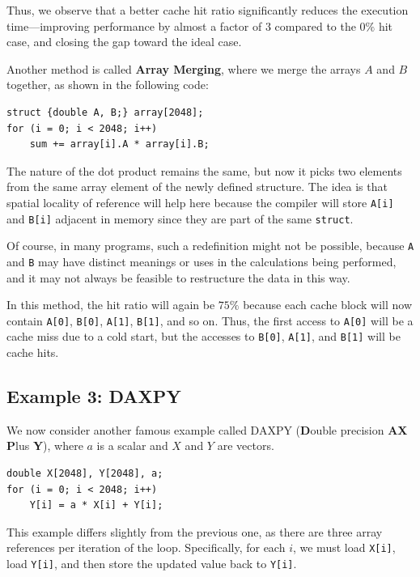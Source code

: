 \documentclass[12pt]{book}
\begin{document}
Thus, we observe that a better cache hit ratio significantly reduces the execution time—improving performance by almost a factor of $3$ compared to the $0\%$ hit case, and closing the gap toward the ideal case.


Another method is called \textbf{Array Merging}, where we merge the arrays $A$ and $B$ together, as shown in the following code:

\begin{lstlisting}[style=cppstyle]
struct {double A, B;} array[2048];
for (i = 0; i < 2048; i++) 
    sum += array[i].A * array[i].B;
\end{lstlisting}

The nature of the dot product remains the same, but now it picks two elements from the same array element of the newly defined structure. The idea is that spatial locality of reference will help here because the compiler will store \texttt{A[i]} and \texttt{B[i]} adjacent in memory since they are part of the same \texttt{struct}. 

Of course, in many programs, such a redefinition might not be possible, because \texttt{A} and \texttt{B} may have distinct meanings or uses in the calculations being performed, and it may not always be feasible to restructure the data in this way.

In this method, the hit ratio will again be $75\%$ because each cache block will now contain \texttt{A[0]}, \texttt{B[0]}, \texttt{A[1]}, \texttt{B[1]}, and so on. Thus, the first access to \texttt{A[0]} will be a cache miss due to a cold start, but the accesses to \texttt{B[0]}, \texttt{A[1]}, and \texttt{B[1]} will be cache hits.

\subsection{Example 3: DAXPY}

We now consider another famous example called DAXPY (\textbf{D}ouble precision \textbf{AX} \textbf{P}lus \textbf{Y}), where $a$ is a scalar and $X$ and $Y$ are vectors.

\begin{lstlisting}[style=cppstyle, caption={Double precision AX Plus Y (DAXPY)}]
double X[2048], Y[2048], a;
for (i = 0; i < 2048; i++) 
    Y[i] = a * X[i] + Y[i];
\end{lstlisting}

This example differs slightly from the previous one, as there are three array references per iteration of the loop. Specifically, for each $i$, we must load \texttt{X[i]}, load \texttt{Y[i]}, and then store the updated value back to \texttt{Y[i]}. 
\end{document}
